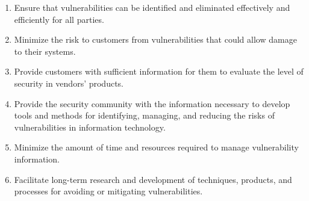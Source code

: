 \documentclass[12pt]{article}
\begin{document}
\begin{enumerate}
  \item Ensure that vulnerabilities can be identified and eliminated
    effectively and efficiently for all parties.
  \item Minimize the risk to customers from vulnerabilities that could
   allow damage to their systems.
  \item Provide customers with sufficient information for them to evaluate
   the level of security in vendors' products.
  \item Provide the security community with the information necessary to
   develop tools and methods for identifying, managing, and reducing the
   risks of vulnerabilities in information technology.
  \item Minimize the amount of time and resources required to manage
   vulnerability information.
  \item Facilitate long-term research and development of techniques,
   products, and processes for avoiding or mitigating vulnerabilities.
\end{enumerate}
\end{document}
